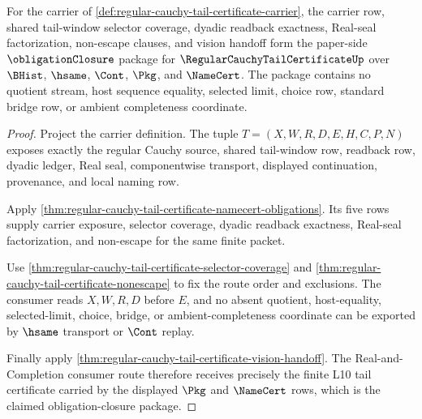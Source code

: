 \begin{theorem}
\label{thm:regular-cauchy-tail-certificate-obligation-closure-package}
For the carrier of \autoref{def:regular-cauchy-tail-certificate-carrier}, the carrier row, shared tail-window selector coverage, dyadic readback exactness, Real-seal factorization, non-escape clauses, and vision handoff form the paper-side $\obligationClosure$ package for $\RegularCauchyTailCertificateUp$ over $\BHist$, $\hsame$, $\Cont$, $\Pkg$, and $\NameCert$. The package contains no quotient stream, host sequence equality, selected limit, choice row, standard bridge row, or ambient completeness coordinate.
\end{theorem}
\begin{proof}
Project the carrier definition. The tuple $T=(X,W,R,D,E,H,C,P,N)$ exposes exactly the regular Cauchy source, shared tail-window row, readback row, dyadic ledger, Real seal, componentwise transport, displayed continuation, provenance, and local naming row.

Apply \autoref{thm:regular-cauchy-tail-certificate-namecert-obligations}. Its five rows supply carrier exposure, selector coverage, dyadic readback exactness, Real-seal factorization, and non-escape for the same finite packet.

Use \autoref{thm:regular-cauchy-tail-certificate-selector-coverage} and \autoref{thm:regular-cauchy-tail-certificate-nonescape} to fix the route order and exclusions. The consumer reads $X,W,R,D$ before $E$, and no absent quotient, host-equality, selected-limit, choice, bridge, or ambient-completeness coordinate can be exported by $\hsame$ transport or $\Cont$ replay.

Finally apply \autoref{thm:regular-cauchy-tail-certificate-vision-handoff}. The Real-and-Completion consumer route therefore receives precisely the finite L10 tail certificate carried by the displayed $\Pkg$ and $\NameCert$ rows, which is the claimed obligation-closure package.
\end{proof}

